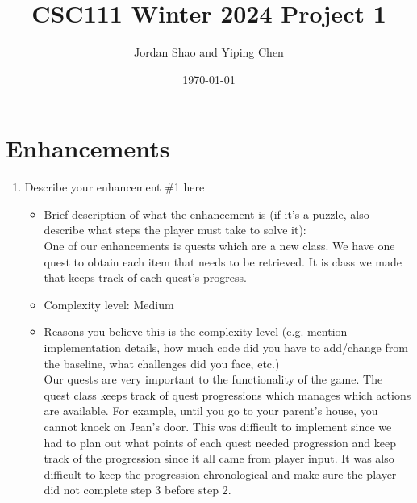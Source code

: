 \documentclass[11pt]{article}
\title{CSC111 Winter 2024 Project 1}
\author{Jordan Shao and Yiping Chen}
\date{\today}
\begin{document}
\maketitle

\section*{Enhancements}


\begin{enumerate}

\item Describe your enhancement \#1 here
	\begin{itemize}
	\item Brief description of what the enhancement is (if it's a puzzle, also describe what steps the player must take to solve it):
 \\One of our enhancements is quests which are a new class. We have one quest to obtain each item that needs to be retrieved. It is class we made that keeps track of each quest's progress.
	\item Complexity level: Medium
	\item Reasons you believe this is the complexity level (e.g. mention implementation details, how much code did you have to add/change from the baseline, what challenges did you face, etc.)
 \\Our quests are very important to the functionality of the game. The quest class keeps track of quest progressions which manages which actions are available. For example, until you go to your parent's house, you cannot knock on Jean's door. This was difficult to implement since we had to plan out what points of each quest needed progression and keep track of the progression since it all came from player input. It was also difficult to keep the progression chronological and make sure the player did not complete step 3 before step 2. 
	\end{itemize}


\end{enumerate}
\end{document}
